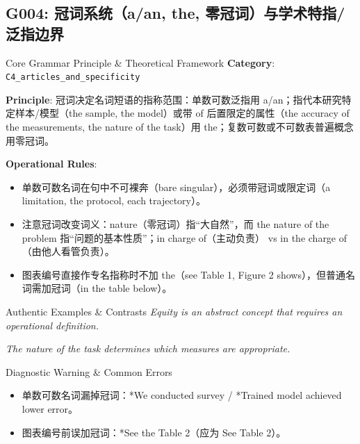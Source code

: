 \subsection{G004: 冠词系统（a/an, the, 零冠词）与学术特指/泛指边界}\label{sec:rule:G004}
\begin{ConceptBox}{Core Grammar Principle \& Theoretical Framework}
\textbf{Category}: \texttt{C4\_articles\_and\_specificity}\par\vspace{3pt}
\textbf{Principle}: 冠词决定名词短语的指称范围：单数可数泛指用 a/an；指代本研究特定样本/模型（the sample, the model）或带 of 后置限定的属性（the accuracy of the measurements, the nature of the task）用 the；复数可数或不可数表普遍概念用零冠词。\par\vspace{4pt}
\textbf{Operational Rules}:
\begin{itemize}[leftmargin=1.5em, itemsep=1pt]
  \item 单数可数名词在句中不可裸奔（bare singular），必须带冠词或限定词（a limitation, the protocol, each trajectory）。
  \item 注意冠词改变词义：nature（零冠词）指“大自然”，而 the nature of the problem 指“问题的基本性质”；in charge of（主动负责） vs in the charge of（由他人看管负责）。
  \item 图表编号直接作专名指称时不加 the（see Table 1, Figure 2 shows），但普通名词需加冠词（in the table below）。
\end{itemize}
\end{ConceptBox}
\begin{ExampleBox}{Authentic Examples \& Contrasts}
\textit{Equity is an abstract concept that requires an operational definition.}\par\vspace{2pt}
\textit{The nature of the task determines which measures are appropriate.}\par\vspace{2pt}
\end{ExampleBox}
\begin{TipBox}{Diagnostic Warning \& Common Errors}
\begin{itemize}[leftmargin=1.5em, itemsep=1pt]
  \item 单数可数名词漏掉冠词：*We conducted survey / *Trained model achieved lower error。
  \item 图表编号前误加冠词：*See the Table 2（应为 See Table 2）。
\end{itemize}
\end{TipBox}
\vspace{6pt}
